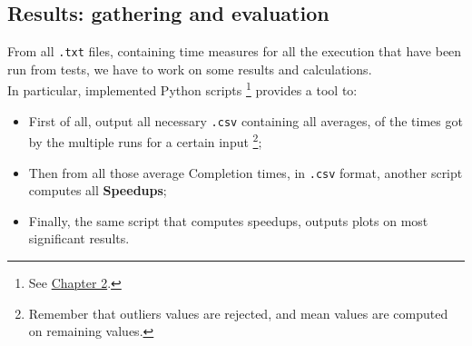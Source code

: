 \subsection{Results: gathering and evaluation}
\label{subs:resgath}
From all \texttt{.txt} files, containing time measures for all the execution that have been run from tests, we have to work on some results and calculations.\\
In particular, implemented Python scripts \footnote{See \hyperref[chap:tools]{Chapter 2}.} provides a tool to:
\begin{itemize}
	\item First of all, output all necessary \texttt{.csv} containing all averages, of the times got by the multiple runs for a certain input \footnote{Remember that outliers values are rejected, and mean values are computed on remaining values.};
	\item Then from all those average Completion times, in \texttt{.csv} format, another script computes all \textbf{Speedups};
	\item Finally, the same script that computes speedups, outputs plots on most significant results.\\
\end{itemize}


